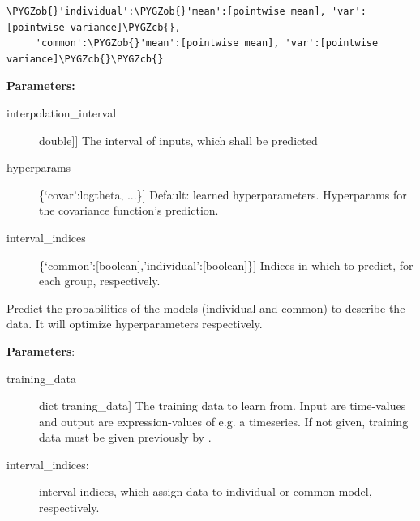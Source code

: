 \documentclass[letterpaper,10pt,english]{sphinxmanual}
\def\PYGZob{\char`\{}
\def\PYGZcb{\char`\}}
\begin{document}
\begin{fulllineitems}
\begin{fulllineitems}
\begin{Verbatim}[commandchars=\\\{\}]
\PYGZob{}'individual':\PYGZob{}'mean':[pointwise mean], 'var':[pointwise variance]\PYGZcb{},
     'common':\PYGZob{}'mean':[pointwise mean], 'var':[pointwise variance]\PYGZcb{}\PYGZcb{}
\end{Verbatim}

\textbf{Parameters:}
\begin{description}
\item[{interpolation\_interval}] \leavevmode{[}{[}double{]}{]}
The interval of inputs, which shall be predicted

\item[{hyperparams}] \leavevmode{[}\{`covar':logtheta, ...\}{]}
Default: learned hyperparameters. Hyperparams for the covariance function's prediction.

\item[{interval\_indices}] \leavevmode{[}\{`common':{[}boolean{]},'individual':{[}boolean{]}\}{]}
Indices in which to predict, for each group, respectively.

\end{description}

\end{fulllineitems}


\begin{fulllineitems}
\label{base:gptwosample.twosample.twosample_base.TwoSampleBase.predict_model_likelihoods}
Predict the probabilities of the models (individual and common) to describe the data.
It will optimize hyperparameters respectively.

\textbf{Parameters}:
\begin{description}
\item[{training\_data}] \leavevmode{[}dict traning\_data{]}
The training data to learn from. Input are time-values and
output are expression-values of e.g. a timeseries.
If not given, training data must be given previously by
.

\item[{interval\_indices: {\hyperref[data:gptwosample.data.data_base.get_model_structure]{}}}] \leavevmode
interval indices, which assign data to individual or common model,
respectively.


\end{description}
\end{fulllineitems}
\end{fulllineitems}
\end{document}

